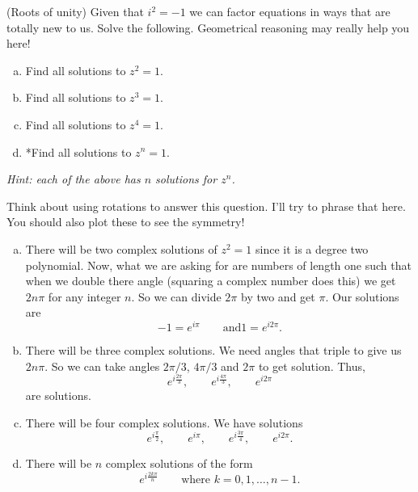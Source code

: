 \documentclass[12pt]{article} %
\begin{document}
\newpage

\begin{problem}
(Roots of unity) Given that $i^2=-1$ we can factor equations in ways that are totally new to us.  Solve the following. Geometrical reasoning may really help you here!
\begin{enumerate}[(a)]
    \item Find all solutions to $z^2=1$.
    \item Find all solutions to $z^3=1$.
    \item Find all solutions to $z^4=1$.
    \item *Find all solutions to $z^n=1$.
\end{enumerate}
\emph{Hint: each of the above has $n$ solutions for $z^n$.}
\end{problem}
\begin{solution}
Think about using rotations to answer this question.  I'll try to phrase that here. You should also plot these to see the symmetry!
\begin{enumerate}[(a)]
    \item There will be two complex solutions of $z^2=1$ since it is a degree two polynomial.  Now, what we are asking for are numbers of length one such that when we double there angle (squaring a complex number does this) we get $2n\pi$ for any integer $n$.  So we can divide $2\pi$ by two and get $\pi$. Our solutions are
    \[
    -1=e^{i\pi} \qquad \textrm{and} 1=e^{i2\pi}.
    \]
    \item There will be three complex solutions. We need angles that triple to give us $2n\pi$.  So we can take angles $2\pi/3$, $4\pi/3$ and $2\pi$ to get solution. Thus,
    \[
    e^{i\frac{2\pi}{3}}, \qquad e^{i\frac{4\pi}{3}}, \qquad e^{i2\pi}
    \]
    are solutions.
    \item There will be four complex solutions. We have solutions
    \[
    e^{i\frac{\pi}{2}}, \qquad e^{i\pi}, \qquad e^{i\frac{3\pi}{4}}, \qquad e^{i2\pi}.
    \]
    \item There will be $n$ complex solutions of the form
    \[
    e^{i\frac{2k\pi}{n}} \qquad \textrm{where $k=0,1,\dots,n-1$}.
    \]
\end{enumerate}
\end{solution}

\newpage
\end{document}
